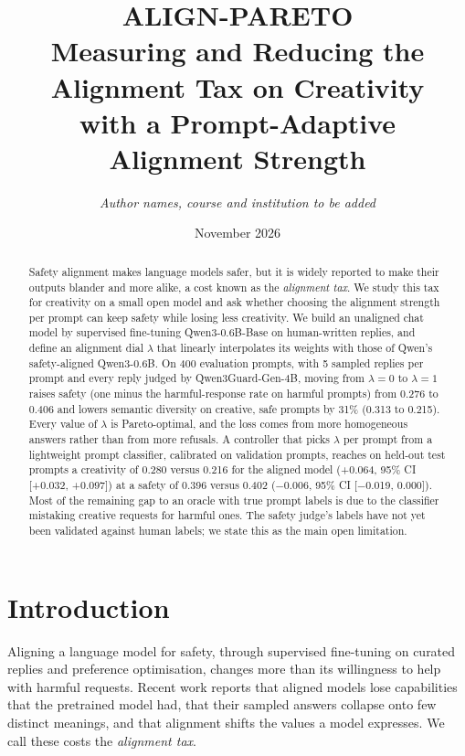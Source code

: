 \documentclass[11pt,a4paper]{article}
\title{\textbf{ALIGN-PARETO}\\[4pt]
\large Measuring and Reducing the Alignment Tax on Creativity\\ with a Prompt-Adaptive Alignment Strength}
\author{\small\textit{Author names, course and institution to be added}}
\date{November 2026}
\newcommand{\lam}{\lambda}
\begin{document}
\maketitle

\begin{abstract}
Safety alignment makes language models safer, but it is widely reported to make their outputs blander and more alike, a cost known as the \emph{alignment tax}. We study this tax for creativity on a small open model and ask whether choosing the alignment strength per prompt can keep safety while losing less creativity. We build an unaligned chat model by supervised fine-tuning Qwen3-0.6B-Base on human-written replies, and define an alignment dial $\lam$ that linearly interpolates its weights with those of Qwen's safety-aligned Qwen3-0.6B. On 400 evaluation prompts, with 5 sampled replies per prompt and every reply judged by Qwen3Guard-Gen-4B, moving from $\lam=0$ to $\lam=1$ raises safety (one minus the harmful-response rate on harmful prompts) from 0.276 to 0.406 and lowers semantic diversity on creative, safe prompts by 31\% (0.313 to 0.215). Every value of $\lam$ is Pareto-optimal, and the loss comes from more homogeneous answers rather than from more refusals. A controller that picks $\lam$ per prompt from a lightweight prompt classifier, calibrated on validation prompts, reaches on held-out test prompts a creativity of 0.280 versus 0.216 for the aligned model (+0.064, 95\% CI [+0.032, +0.097]) at a safety of 0.396 versus 0.402 ($-$0.006, 95\% CI [$-$0.019, 0.000]). Most of the remaining gap to an oracle with true prompt labels is due to the classifier mistaking creative requests for harmful ones. The safety judge's labels have not yet been validated against human labels; we state this as the main open limitation.
\end{abstract}

\section{Introduction}

Aligning a language model for safety, through supervised fine-tuning on curated replies and preference optimisation, changes more than its willingness to help with harmful requests. Recent work reports that aligned models lose capabilities that the pretrained model had\cite{lin2024mitigating}, that their sampled answers collapse onto few distinct meanings\cite{liu2026homogenization}, and that alignment shifts the values a model expresses\cite{chen2026value}. We call these costs the \emph{alignment tax}.
\end{document}
